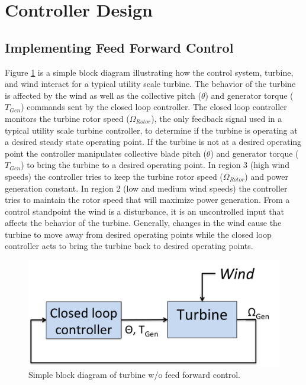 \section{Controller Design} \label{section3-3}

\subsection{Implementing Feed Forward Control} \label{section3-3-1}

Figure \ref{fig3-7} is a simple block diagram illustrating how the control system, turbine, and wind interact for a typical utility scale turbine. The behavior of the turbine is affected by the wind as well as the collective pitch ($\theta$) and generator torque ($T_{Gen}$) commands sent by the closed loop controller. The closed loop controller monitors the turbine rotor speed ($\Omega_{Rotor}$), the only feedback signal used in a typical utility scale turbine controller, to determine if the turbine is operating at a desired steady state operating point. If the turbine is not at a desired operating point the controller manipulates collective blade pitch ($\theta$) and generator torque ($T_{Gen}$) to bring the turbine to a desired operating point. In region 3 (high wind speeds) the controller tries to keep the turbine rotor speed ($\Omega_{Rotor}$) and power generation constant. In region 2 (low and medium wind speeds) the controller tries to maintain the rotor speed that will maximize power generation. From a control standpoint the wind is a disturbance, it is an uncontrolled input that affects the behavior of the turbine. Generally, changes in the wind cause the turbine to move away from desired operating points while the closed loop controller acts to bring the turbine back to desired operating points.


 \begin{figure}[htbp]
	\centering
		\includegraphics[width=.6\linewidth]{Figures/ch3Figures/fig3-7.png}
		
	\caption{Simple block diagram of turbine w/o feed forward control.}
	\label{fig3-7}
\end{figure}

